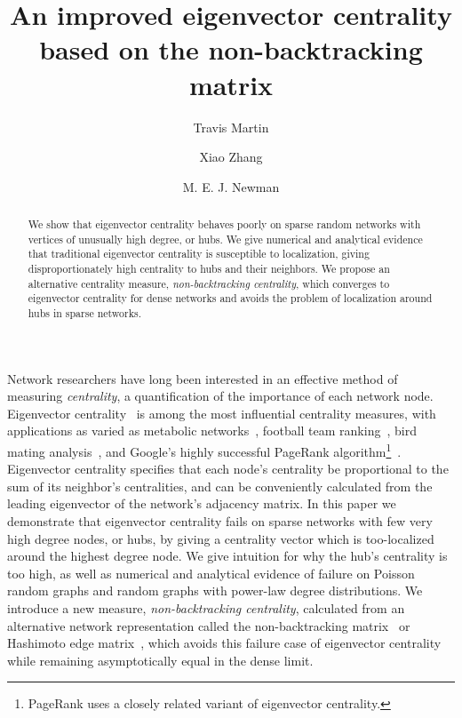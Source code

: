 \documentclass[twocolumn,prl,superscriptaddress]{revtex4}
\begin{document}
\title{An improved eigenvector centrality based on the non-backtracking matrix}
\author{Travis Martin}
\author{Xiao Zhang}
\author{M. E. J. Newman}

\begin{abstract}
  We show that eigenvector centrality behaves poorly on sparse random networks with vertices of unusually high degree, or hubs. We give numerical and analytical evidence that traditional eigenvector centrality is susceptible to localization, giving disproportionately high centrality to hubs and their neighbors. We propose an alternative centrality measure, \emph{non-backtracking centrality}, which converges to eigenvector centrality for dense networks and avoids the problem of localization around hubs in sparse networks.
\end{abstract}

\maketitle

Network researchers have long been interested in an effective method of measuring \emph{centrality}, a quantification of the importance of each network node. Eigenvector centrality~\cite{bonacich72} is among the most influential centrality measures, with applications as varied as metabolic networks~\cite{ding10}, football team ranking~\cite{keener93}, bird mating analysis~\cite{ryder08}, and Google's highly successful PageRank algorithm\footnote{PageRank uses a closely related variant of eigenvector centrality.}~\cite{page99}. Eigenvector centrality specifies that each node's centrality be proportional to the sum of its neighbor's centralities, and can be conveniently calculated from the leading eigenvector of the network's adjacency matrix. In this paper we demonstrate that eigenvector centrality fails on sparse networks with few very high degree nodes, or hubs, by giving a centrality vector which is too-localized around the highest degree node. We give intuition for why the hub's centrality is too high, as well as numerical and analytical evidence of failure on Poisson random graphs and random graphs with power-law degree distributions. We introduce a new measure, \emph{non-backtracking centrality}, calculated from an alternative network representation called the non-backtracking matrix~\cite{krzakala13} or Hashimoto edge matrix~\cite{hashimoto89}, which avoids this failure case of eigenvector centrality while remaining asymptotically equal in the dense limit.
\end{document}
